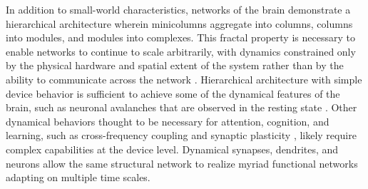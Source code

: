 \documentclass[twocolumn]{article}
\begin{document}
\begin{figure} 
\end{figure}

In addition to small-world characteristics, networks of the brain demonstrate a hierarchical architecture wherein minicolumns aggregate into columns, columns into modules, and modules into complexes. This fractal property is necessary to enable networks to continue to scale arbitrarily, with dynamics constrained only by the physical hardware and spatial extent of the system rather than by the ability to communicate across the network \cite{plth2006}.  Hierarchical architecture with simple device behavior is sufficient to achieve some of the dynamical features of the brain, such as neuronal avalanches \cite{be2007,frla2013} that are observed in the resting state \cite{peth2009}. Other dynamical behaviors thought to be necessary for attention, cognition, and learning, such as cross-frequency coupling \cite{heze2010} and synaptic plasticity \cite{somi2000,mage2012,ab2008,fudr2005}, likely require complex capabilities at the device level. Dynamical synapses, dendrites, and neurons allow the same structural network to realize myriad functional networks adapting on multiple time scales. 
\end{document}
